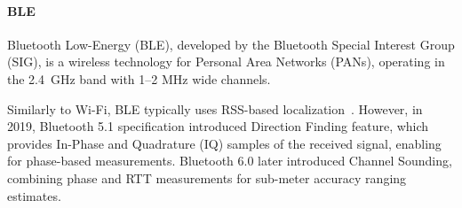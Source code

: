 \paragraph{BLE}
Bluetooth Low-Energy (BLE), developed by the Bluetooth Special Interest Group (SIG), is a wireless technology for Personal Area Networks (PANs), operating in the \SI{2.4}{\giga\hertz} band with 1–2 \si{\mega\hertz} wide channels.

Similarly to Wi-Fi, BLE typically uses RSS-based localization~\cite{leitch2023indoor}. However, in 2019, Bluetooth 5.1 specification introduced Direction Finding feature, which provides In-Phase and Quadrature (IQ) samples of the received signal, enabling for phase-based measurements. Bluetooth 6.0 later introduced Channel Sounding, combining phase and RTT measurements for sub-meter accuracy ranging estimates.





